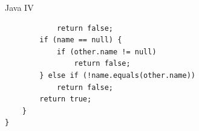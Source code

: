 \documentclass[10pt]{beamer}
\begin{document}
	\begin{frame}[fragile]{Java IV}
		\vspace{-2.5cm}
		\begin{verbatim}
			return false;
		if (name == null) {
			if (other.name != null)
				return false;
		} else if (!name.equals(other.name))
			return false;
		return true;
	}
}
		\end{verbatim}
\end{frame}
\end{document}
